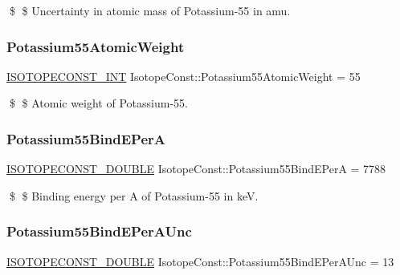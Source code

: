 \$ \$ Uncertainty in atomic mass of Potassium-\/55 in amu. \mbox{\label{group___isotope_const-_potassium-_k55_gada1b8412e1e6a36a7f31872a49c065b3}} 
\subsubsection{\texorpdfstring{Potassium55\+Atomic\+Weight}{Potassium55AtomicWeight}}
{\footnotesize\ttfamily \mbox{\hyperlink{group___isotope_const-_macros_ga5f18360b3e99483a35c32d789e62621c}{I\+S\+O\+T\+O\+P\+E\+C\+O\+N\+S\+T\+\_\+\+I\+NT}} Isotope\+Const\+::\+Potassium55\+Atomic\+Weight = 55}

\$ \$ Atomic weight of Potassium-\/55. \mbox{\label{group___isotope_const-_potassium-_k55_ga9486052816958650a013e53627307e7b}} 
\subsubsection{\texorpdfstring{Potassium55\+Bind\+E\+PerA}{Potassium55BindEPerA}}
{\footnotesize\ttfamily \mbox{\hyperlink{group___isotope_const-_macros_ga8f45a7272ce02c0b4c65c44636ed719a}{I\+S\+O\+T\+O\+P\+E\+C\+O\+N\+S\+T\+\_\+\+D\+O\+U\+B\+LE}} Isotope\+Const\+::\+Potassium55\+Bind\+E\+PerA = 7788}

\$ \$ Binding energy per A of Potassium-\/55 in keV. \mbox{\label{group___isotope_const-_potassium-_k55_ga7bf28e501c71c6fc1ed6ba8553d3ce62}} 
\subsubsection{\texorpdfstring{Potassium55\+Bind\+E\+Per\+A\+Unc}{Potassium55BindEPerAUnc}}
{\footnotesize\ttfamily \mbox{\hyperlink{group___isotope_const-_macros_ga8f45a7272ce02c0b4c65c44636ed719a}{I\+S\+O\+T\+O\+P\+E\+C\+O\+N\+S\+T\+\_\+\+D\+O\+U\+B\+LE}} Isotope\+Const\+::\+Potassium55\+Bind\+E\+Per\+A\+Unc = 13}

